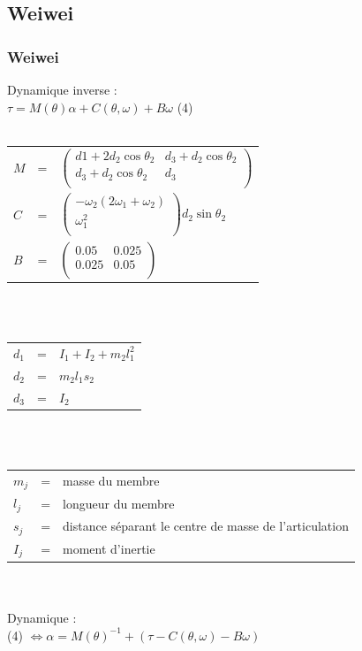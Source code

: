 \documentclass{beamer}
\begin{document}

\subsection{Weiwei}

\begin{frame}
\frametitle{Weiwei}
Dynamique inverse :\\
$\tau = M(\theta)\alpha + C(\theta, \omega) + B\omega $ (4)\\
~\\
\begin{tabular}{lcl}
    $M$ & = &
    $
    \begin{pmatrix}
        d1 + 2 d_2 \cos\theta_2  & d_3 + d_2 \cos \theta_2 \\
        d_3 + d_2 \cos\theta_2 & d_3 \\
    \end{pmatrix}
    $ \\

    $C$ & = &
    $
    \begin{pmatrix}
        -\omega_2 (2 \omega_1 + \omega_2) \\
        \omega_1^2 \\
    \end{pmatrix}
    d_2 \sin\theta_2
    $\\

    $B$ & = &
    $
    \begin{pmatrix}
        0.05  & 0.025 \\
        0.025 & 0.05 \\
    \end{pmatrix}
    $
\end{tabular}\\
~\\
\begin{tabular}{lcl}
    $d_1$ & = & $I_1 + I_2 + m_2 l_1^2$ \\
    $d_2$ & = & $m_2 l_1 s_2$ \\
    $d_3$ & = & $I_2$ \\
\end{tabular}\\
~\\
\begin{tabular}{lcl}
    $m_j$ & = & masse du membre \\
    $l_j$ & = & longueur du membre \\
    $s_{j}$ & = & distance séparant le centre de masse de l'articulation \\
    $I_{j}$ & = & moment d'inertie \\
\end{tabular}\\
~\\
Dynamique :\\
(4) $\Leftrightarrow \alpha = M(\theta)^{-1} + (\tau - C(\theta, \omega) - B\omega) $
\end{frame}
\end{document}

